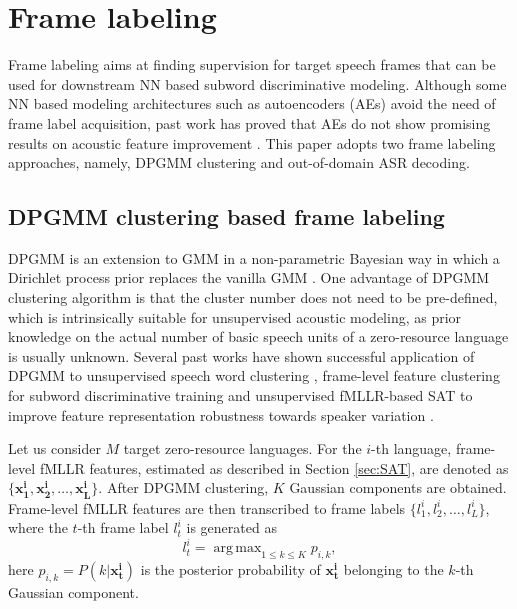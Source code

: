 \documentclass[a4paper]{article}
\DeclareMathOperator*{\argmax}{arg\,max}
\begin{document}
\section{Frame labeling}
\label{sec:frame_labeling}
Frame labeling aims at finding supervision for target speech frames that can be used for downstream NN based subword discriminative modeling.
Although some NN based modeling architectures such as autoencoders (AEs) avoid the need of frame label acquisition, past work has proved that AEs do not show promising results on acoustic feature improvement \cite{renshaw2015comparison}. This paper adopts two frame labeling approaches, namely, DPGMM clustering and out-of-domain ASR decoding.
\subsection{DPGMM clustering based frame labeling}
DPGMM is an extension to GMM in a non-parametric Bayesian way in which a Dirichlet process prior replaces the vanilla GMM \cite{chang2013parallel}. One advantage of DPGMM clustering algorithm is that the cluster number does not need to be pre-defined, which is intrinsically suitable for unsupervised acoustic modeling, as prior knowledge on the actual number of basic speech units of a zero-resource language is usually unknown. Several past works have shown successful application of DPGMM to unsupervised speech word clustering \cite{kamper2014unsupervised}, frame-level feature clustering for subword discriminative training \cite{chen2015parallel} and unsupervised fMLLR-based SAT to improve feature representation robustness towards speaker variation \cite{heck2017feature,Heck+2016}.

Let us consider $M$ target zero-resource languages. For the $i$-th language, frame-level fMLLR features, estimated as described in Section \ref{sec:SAT}, are denoted as $\{\bm{x_1^{i}, x_2^{i}, \ldots, x_L^{i}}\}$. After DPGMM clustering, $K$ Gaussian components are obtained. Frame-level fMLLR features are then transcribed to frame labels $\{l_1^{i}, l_2^{i}, \ldots, l_L^{i}\}$, where the $t$-th frame label $l_t^{i}$ is generated as
\begin{equation}
\label{eqt:dpgmm_inference}
l^{i}_{t} = \argmax_{1 \le k \le K} p_{i,k},
\end{equation}
here $p_{i,k}=P(k | \bm{x_{t}^{i}})$ is the posterior probability of $\bm{x_{t}^{i}}$ belonging to the $k$-th Gaussian component.
\end{document}
